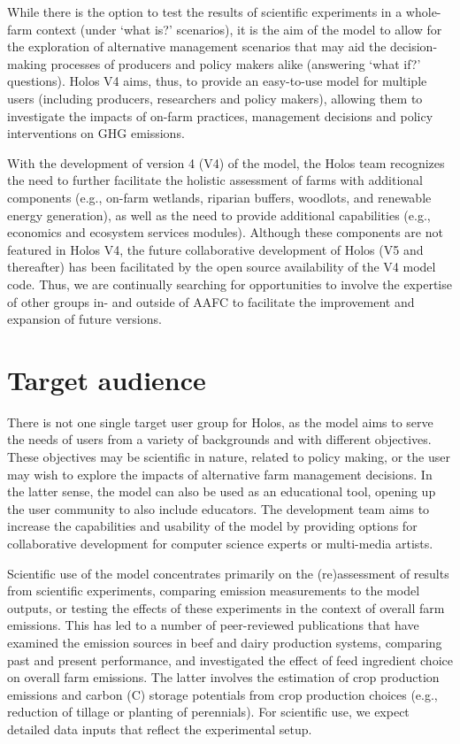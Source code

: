 While there is the option to test the results of scientific experiments in a
whole-farm context (under `what is?' scenarios), it is the aim of the model to
allow for the exploration of alternative management scenarios that may aid the
decision-making processes of producers and policy makers alike (answering `what
if?' questions). Holos V4 aims, thus, to provide an easy-to-use model for
multiple users (including producers, researchers and policy makers), allowing
them to investigate the impacts of on-farm practices, management decisions and
policy interventions on GHG emissions.

With the development of version 4 (V4) of the model, the Holos team recognizes
the need to further facilitate the holistic assessment of farms with additional
components (e.g., on-farm wetlands, riparian buffers, woodlots, and renewable
energy generation), as well as the need to provide additional capabilities
(e.g., economics and ecosystem services modules). Although these components are
not featured in Holos V4, the future collaborative development of Holos (V5 and
thereafter) has been facilitated by the open source availability of the V4
model code. Thus, we are continually searching for opportunities to involve
the expertise of other groups in- and outside of AAFC to facilitate the
improvement and expansion of future versions.

\section{Target audience}
\label{sec:audience}

There is not one single target user group for Holos, as the model aims to serve
the needs of users from a variety of backgrounds and with different objectives.
These objectives may be scientific in nature, related to policy making, or the
user may wish to explore the impacts of alternative farm management decisions.
In the latter sense, the model can also be used as an educational tool, opening
up the user community to also include educators. The development team aims to
increase the capabilities and usability of the model by providing options for
collaborative development for computer science experts or multi-media artists.

Scientific use of the model concentrates primarily on the (re)assessment of
results from scientific experiments, comparing emission measurements to the
model outputs, or testing the effects of these experiments in the context of
overall farm emissions. This has led to a number of peer-reviewed publications
that have examined the emission sources in beef and dairy production systems,
comparing past and present performance, and investigated the effect of feed
ingredient choice on overall farm emissions. The latter involves the estimation
of crop production emissions and carbon (C) storage potentials from crop
production choices (e.g., reduction of tillage or planting of perennials). For
scientific use, we expect detailed data inputs that reflect the experimental
setup.

